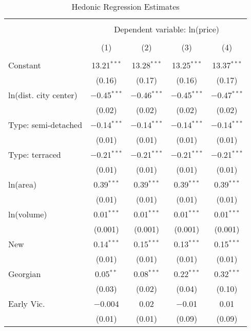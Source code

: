 
\begin{table}[!htbp] \centering 
  \caption{Hedonic Regression Estimates} 
  \label{tab:hedreg} 
\footnotesize 
\begin{tabular}{@{\extracolsep{5pt}}lcccc} 
\\[-1.8ex]\hline 
\hline \\[-1.8ex] 
 & \multicolumn{4}{c}{Dependent variable: ln(price)} \\ 
\cline{2-5} 
\\[-1.8ex] & (1) & (2) & (3) & (4)\\ 
\hline \\[-1.8ex] 
 Constant & 13.21$^{***}$ & 13.28$^{***}$ & 13.25$^{***}$ & 13.37$^{***}$ \\ 
  & (0.16) & (0.17) & (0.16) & (0.17) \\ 
  ln(dist. city center) & $-$0.45$^{***}$ & $-$0.46$^{***}$ & $-$0.45$^{***}$ & $-$0.47$^{***}$ \\ 
  & (0.02) & (0.02) & (0.02) & (0.02) \\ 
  Type: semi-detached & $-$0.14$^{***}$ & $-$0.14$^{***}$ & $-$0.14$^{***}$ & $-$0.14$^{***}$ \\ 
  & (0.01) & (0.01) & (0.01) & (0.01) \\ 
  Type: terraced & $-$0.21$^{***}$ & $-$0.21$^{***}$ & $-$0.21$^{***}$ & $-$0.21$^{***}$ \\ 
  & (0.01) & (0.01) & (0.01) & (0.01) \\ 
  ln(area) & 0.39$^{***}$ & 0.39$^{***}$ & 0.39$^{***}$ & 0.39$^{***}$ \\ 
  & (0.01) & (0.01) & (0.01) & (0.01) \\ 
  ln(volume) & 0.01$^{***}$ & 0.01$^{***}$ & 0.01$^{***}$ & 0.01$^{***}$ \\ 
  & (0.001) & (0.001) & (0.001) & (0.001) \\ 
  New & 0.14$^{***}$ & 0.15$^{***}$ & 0.13$^{***}$ & 0.15$^{***}$ \\ 
  & (0.01) & (0.01) & (0.01) & (0.01) \\ 
  Georgian & 0.05$^{**}$ & 0.08$^{***}$ & 0.22$^{***}$ & 0.32$^{***}$ \\ 
  & (0.03) & (0.02) & (0.04) & (0.10) \\ 
  Early Vic. & $-$0.004 & 0.02 & $-$0.01 & 0.01 \\ 
  & (0.01) & (0.01) & (0.09) & (0.09) \\ 

\end{tabular}
\end{table}
